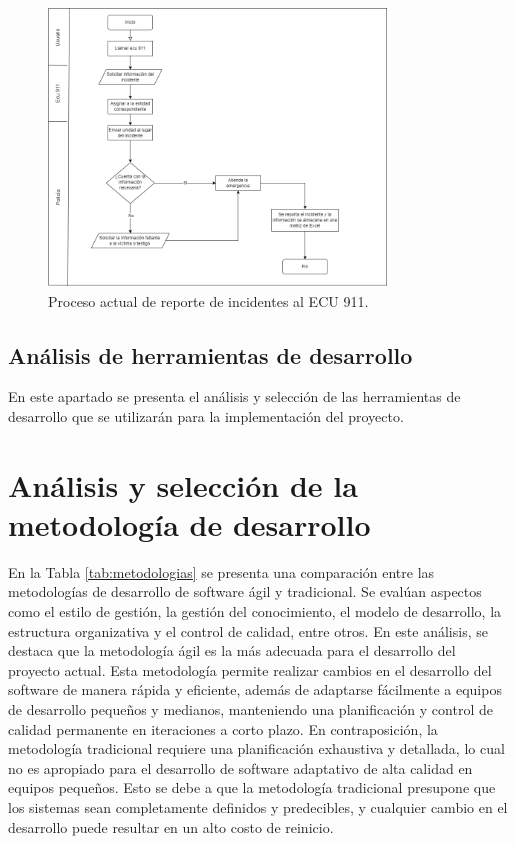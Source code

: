 \begin{figure}[H]
    \centering
    \includegraphics[width=0.8\textwidth]{chapters/III-resultados-y-discusion/resources/images/proceso-actual.png}
    \caption{Proceso actual de reporte de incidentes al ECU 911.}
    \label{fig:proceso-actual}
\end{figure}


\subsection{Análisis de herramientas de desarrollo}
En este apartado se presenta el análisis y selección de las herramientas de desarrollo que se utilizarán para la
implementación del proyecto.

\section{Análisis y selección de la metodología de desarrollo}

En la Tabla \ref{tab:metodologias} se presenta una comparación entre las metodologías de desarrollo de software ágil
y tradicional. Se evalúan aspectos como el estilo de gestión, la gestión del conocimiento, el modelo de desarrollo,
la estructura organizativa y el control de calidad, entre otros. En este análisis, se destaca que la metodología ágil
es la más adecuada para el desarrollo del proyecto actual. Esta metodología permite realizar cambios en el desarrollo
del software de manera rápida y eficiente, además de adaptarse fácilmente a equipos de desarrollo pequeños y medianos,
manteniendo una planificación y control de calidad permanente en iteraciones a corto plazo. En contraposición, la
metodología tradicional requiere una planificación exhaustiva y detallada, lo cual no es apropiado para el desarrollo
de software adaptativo de alta calidad en equipos pequeños. Esto se debe a que la metodología tradicional presupone
que los sistemas sean completamente definidos y predecibles, y cualquier cambio en el desarrollo puede resultar en
un alto costo de reinicio.

